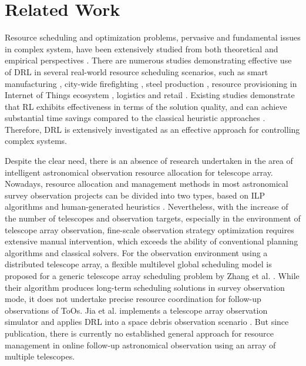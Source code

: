 \section{Related Work}
Resource scheduling and optimization problems, pervasive and fundamental issues in complex system, have been extensively studied from both theoretical and empirical perspectives \cite{hartmann2022updated,liu2023late}. There are numerous studies demonstrating effective use of DRL in several real-world resource scheduling scenarios, such as smart manufacturing \cite{wang2021dynamic}, city-wide firefighting \cite{iqbal2022alma}, steel production \cite{zhou2023reinforcement,feng2024gas}, resource provisioning in Internet of Things ecosystem \cite{chowdhury2019drls, tran2022reinforcement}, logistics and retail \cite{zhou2023reinforcement}. Existing studies demonstrate that RL exhibits effectiveness in terms of the solution quality, and can achieve substantial time savings compared to the classical heuristic approaches \cite{mazyavkina2021reinforcement}. Therefore, DRL is extensively investigated as an effective approach for controlling complex systems.


Despite the clear need, there is an absence of research undertaken in the area of intelligent astronomical observation resource allocation for telescope array. Nowadays, resource allocation and management methods in most astronomical survey observation projects can be divided into two types, based on ILP algorithms \cite{lampoudi2015integer, solar2016scheduling} and human-generated heuristics \cite{liu2018research}. Nevertheless, with the increase of the number of telescopes and observation targets, especially in the environment of telescope array observation, fine-scale observation strategy optimization requires extensive manual intervention, which exceeds the ability of conventional planning algorithms and classical solvers. For the observation environment using a distributed telescope array, a flexible multilevel global scheduling model is proposed for a generic telescope array scheduling problem by Zhang et al. \cite{Zhang_2023}. While their algorithm produces long-term scheduling solutions in survey observation mode, it does not undertake precise resource coordination for follow-up observations of ToOs. Jia et al. implements a telescope array observation simulator and applies DRL into a space debris observation scenario \cite{jia2023observation}. But since publication, there is currently no established general approach for resource management in online follow-up astronomical observation using an array of multiple telescopes.

